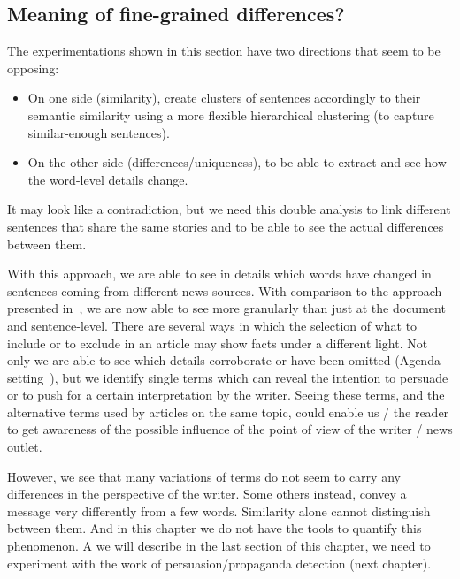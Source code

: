 \subsection{\statusgreen Meaning of fine-grained differences?}
The experimentations shown in this section have two directions that seem to be opposing: 
\begin{itemize}
    \item On one side (similarity), create clusters of sentences accordingly to their semantic similarity using a more flexible hierarchical clustering (to capture similar-enough sentences). %
    \item On the other side (differences/uniqueness), to be able to extract and see how the word-level details change.
\end{itemize}

It may look like a contradiction, but we need this double analysis to link different sentences that share the same stories and to be able to see the actual differences between them.

With this approach, we are able to see in details which words have changed in sentences coming from different news sources.
With comparison to the approach presented in~\citet{bountouridis2018explaining}, we are now able to see more granularly than just at the document and sentence-level.
There are several ways in which the selection of what to include or to exclude in an article may show facts under a different light. Not only we are able to see which details corroborate or have been omitted (Agenda-setting~\citep{TODO}), but we identify single terms which can reveal the intention to persuade or to push for a certain interpretation by the writer. Seeing these terms, and the alternative terms used by articles on the same topic, could enable us / the reader to get awareness of the possible influence of the point of view of the writer / news outlet.

However, we see that many variations of terms do not seem to carry any differences in the perspective of the writer. Some others instead, convey a message very differently from a few words. Similarity alone cannot distinguish between them. And in this chapter we do not have the tools to quantify this phenomenon. A we will describe in the last section of this chapter, we need to experiment with the work of persuasion/propaganda detection (next chapter).



